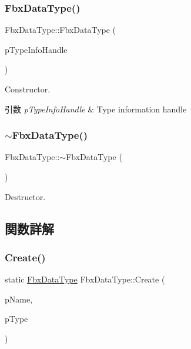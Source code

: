 \subsubsection{\texorpdfstring{Fbx\+Data\+Type()}{FbxDataType()}\hspace{0.1cm}{\footnotesize\ttfamily [3/3]}}
{\footnotesize\ttfamily Fbx\+Data\+Type\+::\+Fbx\+Data\+Type (\begin{DoxyParamCaption}\item[{const \hyperlink{class_fbx_property_handle}{Fbx\+Property\+Handle} \&}]{p\+Type\+Info\+Handle }\end{DoxyParamCaption})}

Constructor. 
\begin{DoxyParams}{引数}
{\em p\+Type\+Info\+Handle} & Type information handle \\
\hline
\end{DoxyParams}
\mbox{\label{class_fbx_data_type_aaad8ea35e6b315bd3346c453825183e1}} 
\subsubsection{\texorpdfstring{$\sim$\+Fbx\+Data\+Type()}{~FbxDataType()}}
{\footnotesize\ttfamily Fbx\+Data\+Type\+::$\sim$\+Fbx\+Data\+Type (\begin{DoxyParamCaption}{ }\end{DoxyParamCaption})}



Destructor. 



\subsection{関数詳解}
\mbox{\label{class_fbx_data_type_a9b5a7c24721bb0d633d12a94e523fee3}} 
\subsubsection{\texorpdfstring{Create()}{Create()}\hspace{0.1cm}{\footnotesize\ttfamily [1/2]}}
{\footnotesize\ttfamily static \hyperlink{class_fbx_data_type}{Fbx\+Data\+Type} Fbx\+Data\+Type\+::\+Create (\begin{DoxyParamCaption}\item[{const char $\ast$}]{p\+Name,  }\item[{const \hyperlink{fbxpropertytypes_8h_a73913a5ddfb20e57c6f25e9e6784bd92}{E\+Fbx\+Type}}]{p\+Type }\end{DoxyParamCaption})\hspace{0.3cm}{\ttfamily [static]}}

